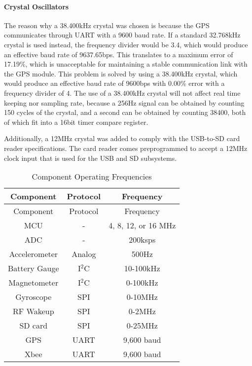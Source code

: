 \paragraph{Crystal Oscillators}
The reason why a 38.400kHz crystal was chosen is because the GPS communicates through UART with a 9600 baud rate. If a standard 32.768kHz crystal is used instead, the frequency divider would be 3.4, which would produce an effective baud rate of 9637.65bps. This translates to a maximum error of 17.19\%, which is unacceptable for maintaining a stable communication link with the GPS module. This problem is solved by using a 38.400kHz crystal, which would produce an effective baud rate of 9600bps with 0.00\% error with a frequency divider of 4. The use of a 38.400kHz crystal will not affect real time keeping nor sampling rate, because a 256Hz signal can be obtained by counting 150 cycles of the crystal, and a second can be obtained by counting 38400, both of which fit into a 16bit timer compare register.

Additionally, a 12MHz crystal was added to comply with the USB-to-SD card reader specifications. The card reader comes preprogrammed to accept a 12MHz clock input that is used for the USB and SD subsystems.

\begin{center}
    \begin{longtable}{|c|c|c|}
    \caption{Component Operating Frequencies  \label{tab:compFreq}} \\
     \hline
    \rowcolor{Gray}
   Component & Protocol & Frequency \\
    \hline \hline \endfirsthead
    
         \hline
    \rowcolor{Gray}
    Component & Protocol & Frequency\\
    \hline \hline \endhead
    
    \endfoot
    MCU   & -     & 4, 8, 12, or 16 MHz \\ \hline
    ADC   & -     & 200ksps \\ \hline %
    Accelerometer & Analog & 500Hz \\ \hline
    Battery Gauge & I$^2$C & 10-100kHz \\ \hline
    Magnetometer & I$^2$C & 0-100kHz \\ \hline
    Gyroscope & SPI   & 0-10MHz \\ \hline
    RF Wakeup & SPI   & 0-2MHz \\ \hline
    SD card & SPI   & 0-25MHz \\ \hline
    GPS   & UART  & 9,600 baud \\ \hline
    Xbee  & UART   & 9,600 baud \\ \hline
    \end{longtable}%

\end{center}%
  \vspace{-2cm}
  
